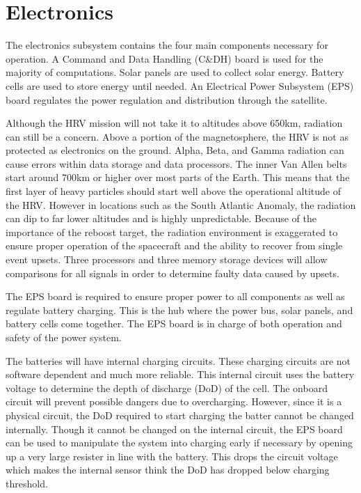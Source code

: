 \documentclass[paper=letter, fontsize=11pt]{scrartcl} %
\numberwithin{equation}{section} %
\numberwithin{figure}{section} %
\numberwithin{table}{section} %
\begin{document}

\section{Electronics}

The electronics subsystem contains the four main components necessary for operation. A Command and Data Handling (C\&DH) board is used for the majority of computations. Solar panels are used to collect solar energy. Battery cells are used to store energy until needed. An Electrical Power Subsystem (EPS) board regulates the power regulation and distribution through the satellite.

Although the HRV mission will not take it to altitudes above 650km, radiation can still be a concern. Above a portion of the magnetosphere, the HRV is not as protected as electronics on the ground. Alpha, Beta, and Gamma radiation can cause errors within data storage and data processors. The inner Van Allen belts start around 700km or higher over most parts of the Earth. This means that the first layer of heavy particles should start well above the operational altitude of the HRV. However in locations such as the South Atlantic Anomaly, the radiation can dip to far lower altitudes and is highly unpredictable. Because of the importance of the reboost target, the radiation environment is exaggerated to ensure proper operation of the spacecraft and the ability to recover from single event upsets. Three processors and three memory storage devices will allow comparisons for all signals in order to determine faulty data caused by upsets.

The EPS board is required to ensure proper power to all components as well as regulate battery charging. This is the hub where the power bus, solar panels, and battery cells come together. The EPS board is in charge of both operation and safety of the power system.

The batteries will have internal charging circuits. These charging circuits are not software dependent and much more reliable. This internal circuit uses the battery voltage to determine the depth of discharge (DoD) of the cell. The onboard circuit will prevent possible dangers due to overcharging. However, since it is a physical circuit, the DoD required to start charging the batter cannot be changed internally. Though it cannot be changed on the internal circuit, the EPS board can be used to manipulate the system into charging early if necessary by opening up a very large resister in line with the battery. This drops the circuit voltage which makes the internal sensor think the DoD has dropped below charging threshold.
\end{document}
